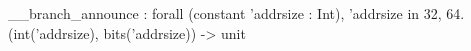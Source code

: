 __branch_announce : forall (constant 'addrsize : Int), 'addrsize in {32, 64}. (int('addrsize), bits('addrsize)) -> unit